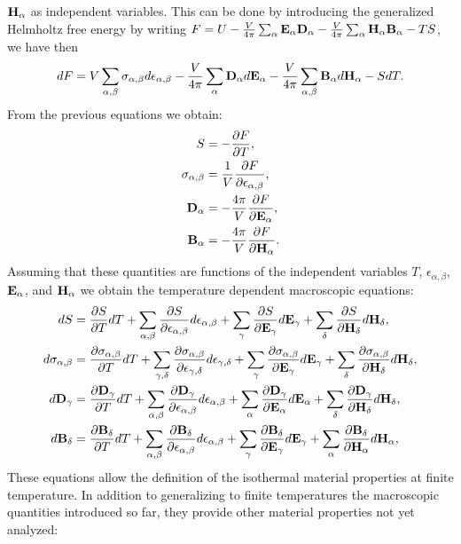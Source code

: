 \documentclass[12pt,a4paper]{article}
\begin{document}
{${\bf H}_\alpha$ as independent variables.
This can be done by introducing the generalized Helmholtz free energy 
by writing
$F=U- {V \over 4 \pi} \sum_{\alpha} {\bf E}_\alpha {\bf D}_\alpha -
{V \over 4 \pi} \sum_{\alpha} {\bf H}_\alpha {\bf B}_\alpha - TS $, we 
have then
\begin{equation}
dF = V \sum_{\alpha,\beta} \sigma_{\alpha,\beta} d \epsilon_{\alpha,\beta}
- {V \over 4 \pi} \sum_\alpha {\bf D}_\alpha d {\bf E}_\alpha - 
{V \over 4 \pi} \sum_{\alpha,\beta} {\bf B}_{\alpha} d {\bf H}_\alpha - S dT.
\end{equation}
From the previous equations we obtain:
\begin{align}
S&=-{\partial F \over \partial T}, \\
\sigma_{\alpha,\beta}&= {1\over V}
{\partial F \over \partial \epsilon_{\alpha,\beta}}, \\
{\bf D}_{\alpha}&= -{4 \pi \over V}
{\partial F \over \partial {\bf E}_{\alpha}}, \\
{\bf B}_{\alpha}&= -{4 \pi \over V}
{\partial F \over \partial {\bf H}_{\alpha}}.
\end{align}
Assuming that these quantities are functions of the independent variables
$T$, $\epsilon_{\alpha,\beta}$, ${\bf E}_\alpha$, and ${\bf H}_\alpha$ we
obtain the temperature dependent macroscopic equations:
\begin{align}
dS&= {\partial S \over \partial T} dT+\sum_{\alpha,\beta}
{\partial S \over \partial \epsilon_{\alpha,\beta}}d\epsilon_{\alpha,\beta}
+\sum_\gamma{\partial S \over \partial {\bf E}_{\gamma}}d{\bf E}_{\gamma}+ 
\sum_\delta{\partial S \over \partial {\bf H}_{\delta}}d{\bf H}_{\delta}, \\
d\sigma_{\alpha,\beta}&=
{\partial \sigma_{\alpha,\beta} \over \partial T} dT+\sum_{\gamma,\delta}
{\partial \sigma_{\alpha,\beta} \over \partial 
\epsilon_{\gamma,\delta}}d\epsilon_{\gamma,\delta}
+\sum_\gamma{\partial \sigma_{\alpha,\beta} \over \partial 
{\bf E}_{\gamma}}d{\bf E}_{\gamma}+ 
\sum_\delta{\partial \sigma_{\alpha,\beta} \over \partial 
{\bf H}_{\delta}}d{\bf H}_{\delta}, \\
d{\bf D}_\gamma&=
{\partial  {\bf D}_\gamma \over \partial T} dT+\sum_{\alpha,\beta}
{\partial {\bf D}_\gamma \over \partial \epsilon_{\alpha,\beta}}
d\epsilon_{\alpha,\beta}
+\sum_\alpha{\partial {\bf D}_\gamma \over \partial {\bf E}_{\alpha}}d{\bf E}_{\alpha}+ 
\sum_\delta{\partial {\bf D}_\gamma \over \partial {\bf H}_{\delta}}d{\bf H}_{\delta}, \\
d{\bf B}_\delta&=
{\partial {\bf B}_\delta \over \partial T} dT+\sum_{\alpha,\beta}
{\partial {\bf B}_\delta \over \partial \epsilon_{\alpha,\beta}}
d\epsilon_{\alpha,\beta}
+\sum_\gamma{\partial {\bf B}_\delta \over \partial {\bf E}_{\gamma}}
d{\bf E}_{\gamma}+ 
\sum_\alpha{\partial {\bf B}_\delta \over \partial {\bf H}_{\alpha}}
d{\bf H}_{\alpha}, 
\end{align}
These equations allow the definition of the isothermal material properties 
at finite temperature. In addition to generalizing to finite temperatures
the macroscopic quantities introduced so far, they provide other material 
properties not yet analyzed:

}
\end{document}
